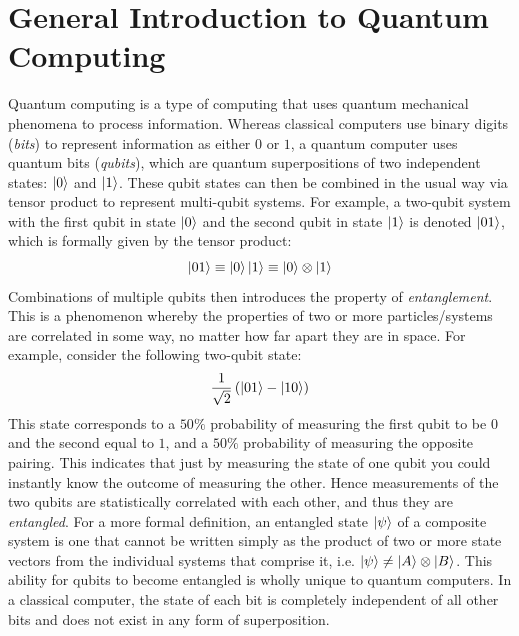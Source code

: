 \documentclass{article}[11pt]
\begin{document}
\pagebreak
\tableofcontents
\pagebreak

\pagestyle{fancy}
\fancyhead{}
\fancyhead[L]{\leftmark}
\fancyhead[R]{\thepage}
\fancyfoot{}


\section{General Introduction to Quantum Computing}
Quantum computing is a type of computing that uses quantum mechanical phenomena to process information. Whereas classical computers use binary digits (\textit{bits}) to represent information as either $0$ or $1$, a quantum computer uses quantum bits (\emph{qubits}), which are quantum superpositions of two independent states: $\ket{0}$ and $\ket{1}$.\cite{candela} These qubit states can then be combined in the usual way via tensor product to represent multi-qubit systems. For example, a two-qubit system with the first qubit in state $\ket{0}$ and the second qubit in state $\ket{1}$ is denoted $\ket{01}$, which is formally given by the tensor product:\cite{nielsenChuang}
\begin{equation}
    \ket{01}\equiv\ket0\ket1\equiv\ket{0}\otimes\ket{1}
\end{equation}
Combinations of multiple qubits then introduces the property of \emph{entanglement}. This is a phenomenon whereby the properties of two or more particles/systems are correlated in some way, no matter how far apart they are in space.\cite{griffiths} For example, consider the following two-qubit state:
\begin{equation}
\frac{1}{\sqrt2}\left(\ket{01}-\ket{10}\right)
\end{equation}
This state corresponds to a $50\%$ probability of measuring the first qubit to be $0$ and the second equal to $1$, and a $50\%$ probability of measuring the opposite pairing. This indicates that just by measuring the state of one qubit you could instantly know the outcome of measuring the other. Hence measurements of the two qubits are statistically correlated with each other, and thus they are \emph{entangled}.\cite{griffiths} For a more formal definition, an entangled state $\ket{\psi}$ of a composite system is one that cannot be written simply as the product of two or more state vectors from the individual systems that comprise it, i.e. $\ket{\psi}\neq\ket{A}\otimes\ket{B}$.\cite{griffiths} This ability for qubits to become entangled is wholly unique to quantum computers. In a classical computer, the state of each bit is completely independent of all other bits and does not exist in any form of superposition.\\
\end{document}

